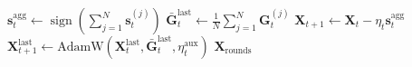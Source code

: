 \documentclass{article}
\begin{document}
\begin{algorithm}[H]
\begin{algorithmic}[1]
        \EndFor
      \EndFor
      \State $\mathbf{s}_t^{\mathrm{agg}} \gets \operatorname{sign}\!\left(\sum_{j=1}^{N} \mathbf{s}_t^{(j)}\right)$ 
      \State $\bar{\mathbf{G}}_t^{\text{last}} \gets \frac{1}{N}\sum_{j=1}^{N} \mathbf{G}_t^{(j)}$ 
      \State $\mathbf{X}_{t+1} \gets \mathbf{X}_t - \eta_t \mathbf{s}_t^{\mathrm{agg}}$ 
      \\ \State $\mathbf{X}_{t+1}^{\text{last}} \gets \text{AdamW}(\mathbf{X}_t^{\text{last}}, \bar{\mathbf{G}}_t^{\text{last}}, \eta_t^{\text{aux}})$ 
\EndFor
\State \Return $\mathbf{X}_{\mathrm{rounds}}$
\label{fed_alg}
\end{algorithmic}
\end{algorithm}
\end{document}
